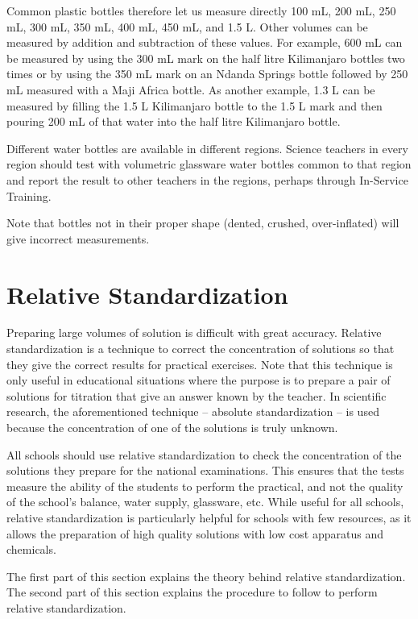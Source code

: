 Common plastic bottles therefore let us measure directly 100 mL, 200 mL, 250 mL, 300 mL, 350 mL, 400 mL, 450 mL, and 1.5 L. Other volumes can be measured by addition and subtraction of these values. For example, 600 mL can be measured by using the 300 mL mark on the half litre Kilimanjaro bottles two times or by using the 350 mL mark on an Ndanda Springs bottle followed by 250 mL measured with a Maji Africa bottle. As another example, 1.3 L can be measured by filling the 1.5 L Kilimanjaro bottle to the 1.5 L mark and then pouring 200 mL of that water into the half litre Kilimanjaro bottle.

Different water bottles are available in different regions. Science teachers in every region should test with volumetric glassware water bottles common to that region and report the result to other teachers in the regions, perhaps through In-Service Training.

Note that bottles not in their proper shape (dented, crushed, over-inflated) will give incorrect measurements.

\section{Relative Standardization}

Preparing large volumes of solution is difficult with great accuracy. Relative standardization is a technique to correct the concentration of solutions so that they give the correct results for practical exercises. Note that this technique is only useful in educational situations where the purpose is to prepare a pair of solutions for titration that give an answer known by the teacher. In scientific research, the aforementioned technique -- absolute standardization -- is used because the concentration of one of the solutions is truly unknown.

All schools should use relative standardization to check the concentration of the solutions they prepare for the national examinations. This ensures that the tests measure the ability of the students to perform the practical, and not the quality of the school's balance, water supply, glassware, etc. While useful for all schools, relative standardization is particularly helpful for schools with few resources, as it allows the preparation of high quality solutions with low cost apparatus and chemicals.

The first part of this section explains the theory behind relative standardization. The second part of this section explains the procedure to follow to perform relative standardization.

